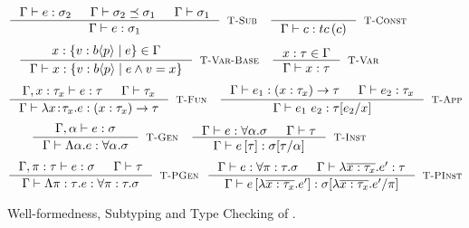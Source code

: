 \begin{figure}[p]
\medskip {}

$$\inference
  {  \hastype{\Gamma}{e}{\sigma_2} && \isSubType{\Gamma}{\sigma_2}{\sigma_1} 
  && \isWellFormed{\Gamma}{\sigma_1}
  }
  {\hastype{\Gamma}{e}{\sigma_1}}
  [\tsub]
\quad
\inference
  {}
  {\hastype{\Gamma}{c}{\tc{c}}}
  [\tconst]
$$
$$
\inference
  {x: \tpref{b}{\areft}{\reft} \in \Gamma}
  {\hastype{\Gamma}{x}{\tpref{b}{\areft}{e \land \vref = x}}}
  [\tbase]
\quad
\inference
  {x:\tau \in \Gamma}
  {\hastype{\Gamma}{x}{\tau}} 
  [\tvariable]
$$
$$
\inference
   {\hastype{\Gamma, x:\tau_x}{e}{\tau} 
    && \isWellFormed{\Gamma}{\tau_x}
   }
   {\hastype{\Gamma}{\efunt{x}{\tau_x}{e}}{\tfun{x}{\tau_x}{\tau}}}
   [\tfunction]
\quad
\inference
   {\hastype{\Gamma}{e_1}{\tfun{x}{\tau_x}{\tau}} 
   &&  \hastype{\Gamma}{e_2}{\tau_x}
   }
   {\hastype{\Gamma}{\eapp{e_1}{e_2}}{\SUBST{\tau}{x}{e_2}}}
   [\tapp]
$$
$$
\inference
  {\hastype{\Gamma, \alpha}{e}{\sigma}}
  {\hastype{\Gamma}{\etabs{\alpha}{e}}{\ttabs{\alpha}{\sigma}}}
  [\tgen]
\quad
\inference
  {\hastype{\Gamma}{e}{\ttabs{\alpha}{\sigma}} && 
   \isWellFormed{\Gamma}{\tau}
  }
  {\hastype{\Gamma}{\etapp{e}{\tau}}{\SUBST{\sigma}{\alpha}{\tau}}}
  [\tinst]
$$
$$
\inference
    {\hastype{\Gamma, \rvar:\tau}{e}{\sigma} &&
     \isWellFormed{\Gamma}{\tau} 
    }
    {\hastype{\Gamma}{\epabs{\rvar}{\tau}{e}}{\tpabs{\rvar}{\tau}{\sigma}}}
    [\tpgen]
\ \
\inference
    {\hastype{\Gamma}{e}{\tpabs{\rvar}{\tau}{\sigma}} && 
     \hastype{\Gamma}{\efunbar{x:\tau_x}{\reft'}}{\tau}
    }
    {\hastype{\Gamma}
             {\epapp{e}{\efunbar{x:\tau_x}{\reft'}}}
             {\rpinst{\sigma}{\rvar}{\efunbar{x:\tau_x}{\reft'}}}
    }
    [\tpinst]
$$
\caption[Type checking of \corelan.]{Well-formedness, Subtyping and Type Checking of \corelan.}
\label{fig:rules}
\end{figure}

